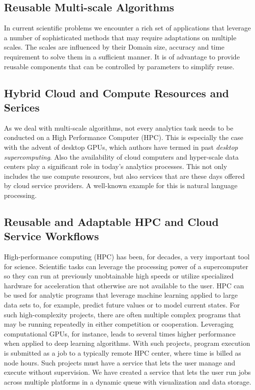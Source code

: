 \subsection{Reusable Multi-scale Algorithms}

In current scientific problems we encounter a rich set of applications that leverage a number of sophisticated methods that may require adaptations on multiple scales. The scales are influenced by their Domain size, accuracy and time requirement to solve them in a sufficient manner. It is of advantage to provide reusable components that can be controlled by parameters to simplify reuse.

\subsection{Hybrid Cloud and Compute Resources and Serices}

As we deal with multi-scale algorithms, not every analytics task needs to be conducted on a High Performance Computer (HPC). This is especially the case with the advent of desktop GPUs, which authors have termed in past {\em desktop supercomputing}. Also the availability of cloud computers and hyper-scale data centers play a significant role in today's analytics processes. This not only includes the use compute resources, but also services that are these days offered by cloud service providers. A well-known example for this is natural language processing.

\subsection{Reusable and Adaptable HPC and Cloud Service Workflows}

High-performance computing (HPC) has been, for decades, a very important tool
for science. Scientific tasks can leverage the processing power of
a supercomputer so they can run at previously unobtainable high speeds
or utilize specialized hardware for acceleration that otherwise are not
available to the user. HPC can be used for analytic programs that
leverage machine learning applied to large data sets to, for example,
predict future values or to model current states. For such
high-complexity projects, there are often multiple complex programs that
may be running repeatedly in either competition or cooperation.
Leveraging computational GPUs, for instance, leads to several times higher
performance when applied to deep learning algorithms. With such
projects, program execution is submitted as a job to a typically remote
HPC center, where time is billed as node hours. Such projects must have
a service that lets the user manage and execute without supervision. We
have created a service that lets the user run jobs across multiple
platforms in a dynamic queue with visualization and data storage.

